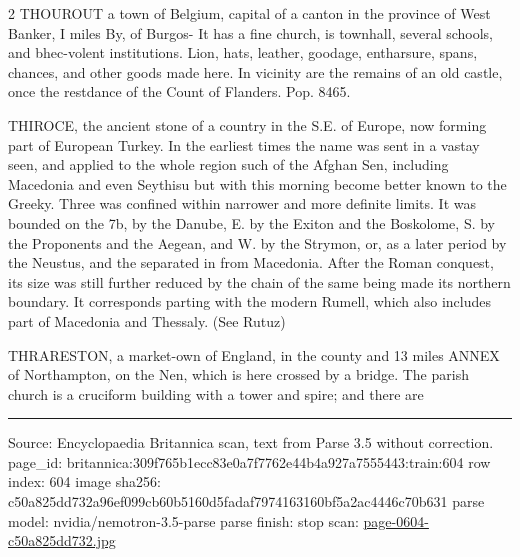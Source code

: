 \documentclass[10pt]{article}
\begin{document}
\begin{multicols}{2}
THOUROUT a town of Belgium, capital of a canton in the province of West Banker, I miles By, of Burgos- It has a fine church, is townhall, several schools, and bhec-volent institutions. Lion, hats, leather, goodage, entharsure, spans, chances, and other goods made here. In vicinity are the remains of an old castle, once the restdance of the Count of Flanders. Pop. 8465.

THIROCE, the ancient stone of a country in the S.E. of Europe, now forming part of European Turkey. In the earliest times the name was sent in a vastay seen, and applied to the whole region such of the Afghan Sen, including Macedonia and even Seythisu but with this morning become better known to the Greeky. Three was confined within narrower and more definite limits. It was bounded on the 7b, by the Danube, E. by the Exiton and the Boskolome, S. by the Proponents and the Aegean, and W. by the Strymon, or, as a later period by the Neustus, and the separated in from Macedonia. After the Roman conquest, its size was still further reduced by the chain of the same being made its northern boundary. It corresponds parting with the modern Rumell, which also includes part of Macedonia and Thessaly. (See Rutuz)

THRARESTON, a market-own of England, in the county and 13 miles ANNEX of Northampton, on the Nen, which is here crossed by a bridge. The parish church is a cruciform building with a tower and spire; and there are

\end{multicols}
\vfill\par\noindent\rule{\linewidth}{0.4pt}\par
{\scriptsize\color{gray}\noindent Source: Encyclopaedia Britannica scan, text from Parse 3.5 without correction. page\_id: britannica:309f765b1ecc83e0a7f7762e44b4a927a7555443:train:604 \quad row index: 604 \quad image sha256: c50a825dd732a96ef099cb60b5160d5fadaf7974163160bf5a2ac4446c70b631 \quad parse model: nvidia/nemotron-3.5-parse \quad parse finish: stop \quad scan: \href{../scans/page-0604-c50a825dd732.jpg}{page-0604-c50a825dd732.jpg}\par}
\end{document}
